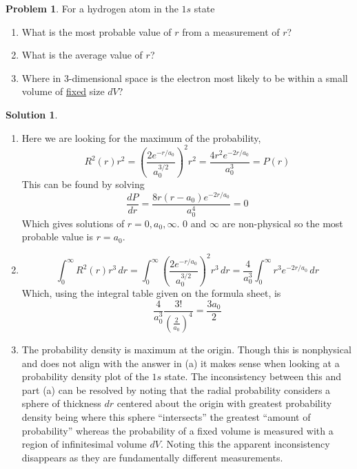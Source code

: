 \documentclass[10pt]{article}
\theoremstyle{definition}
\newtheorem{problem}{Problem}
\newtheorem{soln}{Solution}
\begin{document}
\begin{problem}
For a hydrogen atom in the $1s$ state
\begin{enumerate}[label=(\alph*)]
  \item What is the most probable value of $r$ from a measurement of $r$?
  \item What is the average value of $r$?
  \item Where in 3-dimensional space is the electron most likely to be within a small volume of \underline{fixed} size $dV$?
\end{enumerate}
\end{problem}
\begin{soln}~
  \begin{enumerate}[label=(\alph*)]
    \item Here we are looking for the maximum of the probability,
          $$R^2(r)r^2=\left(\frac{2e^{-r/a_0}}{a_0^{3/2}}\right)^2r^2=\frac{4r^2e^{-2r/a_0}}{a_0^3}=P(r)$$
          This can be found by solving
          $$\frac{dP}{dr}=\frac{8r(r-a_0)e^{-2r/a_0}}{a_0^4}=0$$
          Which gives solutions of $r=0,a_0,\infty$. $0$ and $\infty$ are non-physical so the most probable value is $r=a_0$.
    \item $$\int_0^\infty R^2(r)r^3\,dr
            =\int_0^\infty\left(\frac{2e^{-r/a_0}}{a_0^{3/2}}\right)^2r^3\,dr
            =\frac{4}{a_0^{3}}\int_0^\infty r^3e^{-2r/a_0}\,dr$$
          Which, using the integral table given on the formula sheet, is
          $$\frac{4}{a_0^{3}}\frac{3!}{\left(\frac{2}{a_0}\right)^4}=\frac{3a_0}{2}$$
    \item The probability density is maximum at the origin. Though this is nonphysical and does not align with the answer in (a) it makes sense
          when looking at a probability density plot of the $1s$ state. The inconsistency between this and part (a) can be resolved by noting that
          the radial probability considers a sphere of thickness $dr$ centered about the origin with greatest probability density being where this sphere
          ``intersects'' the greatest ``amount of probability'' whereas the probability of a fixed volume is measured with a region of infinitesimal
          volume $dV$. Noting this the apparent inconsistency disappears as they are fundamentally different measurements.
  \end{enumerate}
\end{soln}
\end{document}
